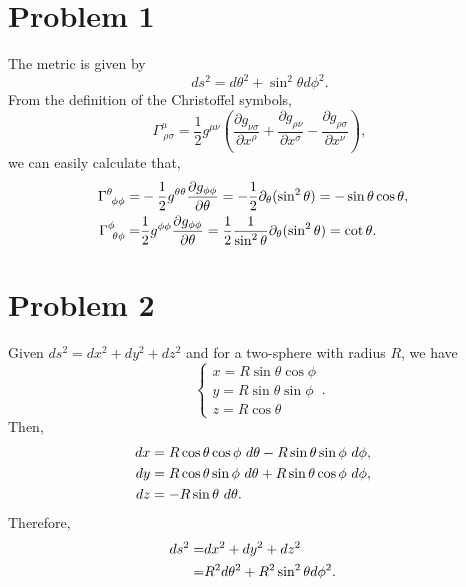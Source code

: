 \documentclass{article}
\begin{document}
\section*{Problem 1}
The metric is given by 
\begin{equation}
    ds^2 = d\theta^2 +\sin^2\theta d\phi^2.
\end{equation}
From the definition of the Christoffel symbols,
\begin{equation}
    \Gamma^\mu_{~\rho \sigma} = \frac{1}{2} g^{\mu \nu}
    \left(
        \frac{\partial g_{\nu \sigma}}{\partial x^\rho}
        +\frac{\partial g_{\rho \nu}}{\partial x^\sigma}
        -\frac{\partial g_{\rho \sigma}}{\partial x^\nu}
    \right),
\end{equation}
we can easily calculate that,
\begin{align}
    \Gamma^\theta_{~\phi \phi} =& -\frac{1}{2} g^{\theta \theta} 
    \frac{\partial g_{\phi \phi}}{\partial \theta}
    = -\frac{1}{2}\partial_\theta(\sin^2\theta)
    = -\sin \theta \cos \theta, \cr
    \Gamma^\phi_{~\theta \phi} = & \frac{1}{2} g^{\phi \phi} 
    \frac{\partial g_{\phi \phi}}{\partial \theta}
    = \frac{1}{2}\frac{1}{\sin^2\theta}\partial_\theta(\sin^2\theta)
    = \cot \theta.
\end{align}

\section*{Problem 2}
Given $ds^2 = dx^2 + dy^2 + dz^2$ and for a two-sphere with radius $R$,
we have
\begin{equation}
    \begin{cases}
        x = R \sin \theta \cos \phi\\
        y = R \sin \theta \sin \phi\\
        z = R \cos \theta
    \end{cases}.
\end{equation}
Then,
\begin{align}
    dx &= R \cos \theta \cos \phi ~d \theta - R \sin \theta \sin\phi ~d \phi,\cr
    dy &= R \cos \theta \sin \phi ~d \theta + R \sin \theta \cos \phi ~d \phi, \cr
    dz &= - R \sin \theta ~d \theta.
\end{align}
Therefore,
\begin{align}
    ds^2 =& dx^2 + dy^2 + dz^2\cr
    =& R^2 d\theta^2 + R^2 \sin^2 \theta d\phi^2.
\end{align}
\end{document}
